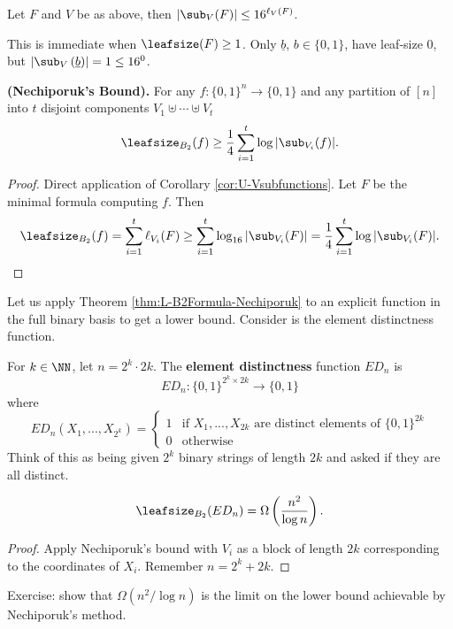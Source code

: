 \begin{corollary}
	\label{cor:U-Vsubfunctions}
	Let $F$ and $V$ be as above, then $|\sub_V(F)| \leq 16^{\ell_V(F)}$.
\end{corollary}
This is immediate when $\leafsize(F) \geq 1$. Only $\underline{b}$, $b \in \{0,1\}$, have leaf-size $0$, but $\left|\sub_V\left(\underline{b}\right)\right| = 1 \leq 16^{0}$. 

\begin{theorem}
	\label{thm:L-B2Formula-Nechiporuk}
	\textbf{(Nechiporuk's Bound).} For any $f: \{0,1\}^n \rightarrow \{0,1\}$ and any partition of $[n]$ into $t$ disjoint components $V_1 \uplus \cdots \uplus V_t$
	\[\leafsize_{B_2}(f) \geq \frac{1}{4}\sum_{i = 1}^{t}\log|\sub_{V_i}(f)|.\]
\end{theorem}
\begin{proof}
	Direct application of Corollary \ref{cor:U-Vsubfunctions}. Let $F$ be the minimal formula computing $f$. Then
	\[\leafsize_{B_2}(f) = \sum_{i = 1}^{t}\ell_{V_i}(F) \geq \sum_{i = 1}^{t}\log_{16}|\sub_{V_i}(F)| = \frac{1}{4} \sum_{i = 1}^{t}\log|\sub_{V_i}(F)|.\]
\end{proof}

Let us apply Theorem \ref{thm:L-B2Formula-Nechiporuk} to an explicit function in the full binary basis to get a lower bound. Consider is the element distinctness function.
\begin{definition}
	\label{def:FUN-elementdistinctness}
	For $k \in \NN$, let $n = 2^k \cdot 2k$. The \textbf{element distinctness} function $ED_n$ is
	\[ED_n: \{0,1\}^{2^k \times 2k} \rightarrow \{0,1\}\] where
	\[ED_n(X_1, ..., X_{2^k}) = \begin{cases}
	1 &\mbox{if $X_1, ..., X_{2k}$ are distinct elements of $\{0,1\}^{2k}$}\\
	0 &\mbox{otherwise}
	\end{cases}\]
	Think of this as being given $2^k$ binary strings of length $2k$ and asked if they are all distinct.
\end{definition} 

\begin{theorem}
	\label{thm:L-B2FormulaQuadraticExplicit}
	\[\leafsize_{B_2}(ED_n) = \Omega\left(\frac{n^2}{\log n}\right).\]
\end{theorem}
\begin{proof}
	Apply Nechiporuk's bound with $V_i$ as a block of length $2k$ corresponding to the coordinates of $X_i$. Remember $n = 2^k + 2k$.  
\end{proof}
Exercise: show that $\Omega(n^2/\log n)$ is the limit on the lower bound achievable by Nechiporuk's method.

